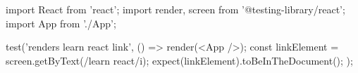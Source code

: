 import React from 'react';
import { render, screen } from '@testing-library/react';
import App from './App';

test('renders learn react link', () => {
  render(<App />);
  const linkElement = screen.getByText(/learn react/i);
  expect(linkElement).toBeInTheDocument();
});